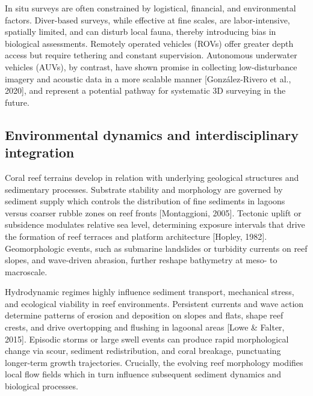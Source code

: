 In situ surveys are often constrained by logistical, financial, and environmental factors. Diver-based surveys, while effective at fine scales, are labor-intensive, spatially limited, and can disturb local fauna, thereby introducing bias in biological assessments. Remotely operated vehicles (ROVs) offer greater depth access but require tethering and constant supervision. Autonomous underwater vehicles (AUVs), by contrast, have shown promise in collecting low-disturbance imagery and acoustic data in a more scalable manner \cite{Gonzalez-Rivero2016} [González-Rivero et al., 2020], and represent a potential pathway for systematic 3D surveying in the future.


\subsection{Environmental dynamics and interdisciplinary integration}
Coral reef terrains develop in relation with underlying geological structures and sedimentary processes. Substrate stability and morphology are governed by sediment supply which controls the distribution of fine sediments in lagoons versus coarser rubble zones on reef fronts [Montaggioni, 2005]. Tectonic uplift or subsidence modulates relative sea level, determining exposure intervals that drive the formation of reef terraces and platform architecture \cite{Hopley2014} [Hopley, 1982]. Geomorphologic events, such as submarine landslides or turbidity currents on reef slopes, and wave-driven abrasion, further reshape bathymetry at meso- to macroscale.

Hydrodynamic regimes highly influence sediment transport, mechanical stress, and ecological viability in reef environments. Persistent currents and wave action determine patterns of erosion and deposition on slopes and flats, shape reef crests, and drive overtopping and flushing in lagoonal areas [Lowe \& Falter, 2015]. Episodic storms or large swell events can produce rapid morphological change via scour, sediment redistribution, and coral breakage, punctuating longer-term growth trajectories. Crucially, the evolving reef morphology modifies local flow fields which in turn influence subsequent sediment dynamics and biological processes. %


